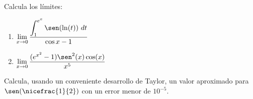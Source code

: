 \documentclass[12pt]{article}
\begin{document}
    \begin{ejercicio}
        Calcula los límites:
        \begin{enumerate}
            \item $\displaystyle \lim_{x\to 0}\dfrac{\displaystyle\int_1^{e^x}\sen(\ln(t))~dt}{\cos x-1}$
            \item $\displaystyle \lim_{x\to 0}\dfrac{(e^{x^2}-1)\sen^2(x)\cos(x)}{x^5}$
        \end{enumerate}
    \end{ejercicio}

    \begin{ejercicio}
        Calcula, usando un conveniente desarrollo de Taylor, un valor aproximado para $\sen(\nicefrac{1}{2})$ con un error menor de $10^{-5}$.
    \end{ejercicio}
   
\end{document}
